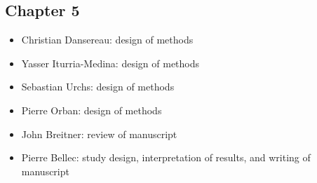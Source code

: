 \documentclass[
12pt, %
oneside, %
english, %
onehalfspacing, %
liststotoc, %
toctotoc, %
headsepline, %
consistentlayout, %
]{McGillThesis} %
\begin{document}
\begin{contributions}
\cleardoublepage

\subsection*{Chapter 5}
\begin{itemize}
\setlength\itemsep{0em}
\item Christian Dansereau: design of methods
\item Yasser Iturria-Medina: design of methods
\item Sebastian Urchs: design of methods
\item Pierre Orban: design of methods
\item John Breitner: review of manuscript
\item Pierre Bellec: study design, interpretation of results, and writing of manuscript
\end{itemize}


\end{contributions}

\cleardoublepage






\mainmatter %

\pagestyle{thesis} %










\printbibliography[heading=bibintoc]

\end{document}
